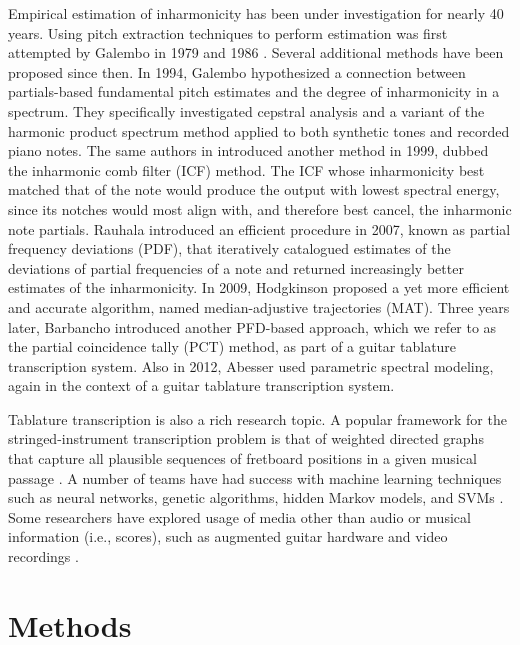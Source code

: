 \documentclass[convention,peer-reviewed]{aesconf}
\begin{document}
Empirical estimation of inharmonicity has been under investigation for nearly 40 years. Using pitch extraction techniques to perform estimation was first attempted by Galembo in 1979 and 1986 \citep{galembo1979,galembo1987}. Several additional methods have been proposed since then. In 1994, Galembo \citep{galembo1994} hypothesized a connection between partials-based fundamental pitch estimates and the degree of inharmonicity in a spectrum. They specifically investigated cepstral analysis and a variant of the harmonic product spectrum method applied to both synthetic tones and recorded piano notes. The same authors in \citep{galembo1999} introduced another method in 1999, dubbed the inharmonic comb filter (ICF) method. The ICF whose inharmonicity best matched that of the note would produce the output with lowest spectral energy, since its notches would most align with, and therefore best cancel, the inharmonic note partials. Rauhala \citep{rauhala2007} introduced an efficient procedure in 2007, known as partial frequency deviations (PDF), that iteratively catalogued estimates of the deviations of partial frequencies of a note and returned increasingly better estimates of the inharmonicity. In 2009, Hodgkinson \citep{hodgkinson2009} proposed a yet more efficient and accurate algorithm, named median-adjustive trajectories (MAT). Three years later, Barbancho \citep{barbanchoi2012} introduced another PFD-based approach, which we refer to as the partial coincidence tally (PCT) method, as part of a guitar tablature transcription system. Also in 2012, Abesser \citep{abesser2012} used parametric spectral modeling, again in the context of a guitar tablature transcription system.

Tablature transcription is also a rich research topic. A popular framework for the stringed-instrument transcription problem is that of weighted directed graphs that capture all plausible sequences of fretboard positions in a given musical passage \citep{sayegh1989,radicioni2005,yazawa2013,burlet2013,burlet2015,radisav2004}. A number of teams have had success with machine learning techniques such as neural networks, genetic algorithms, hidden Markov models, and SVMs  \citep{gagnon2003,tuohy2006,barbancho2009,barbanchoa2012,abesser2012,kehling2014,dittmar2013,abesser2012}. Some researchers have explored usage of media other than audio or musical information (i.e., scores), such as augmented guitar hardware and video recordings \citep{ogrady2009,paleari2008,kerd2007}.

\section{Methods}
\end{document}
